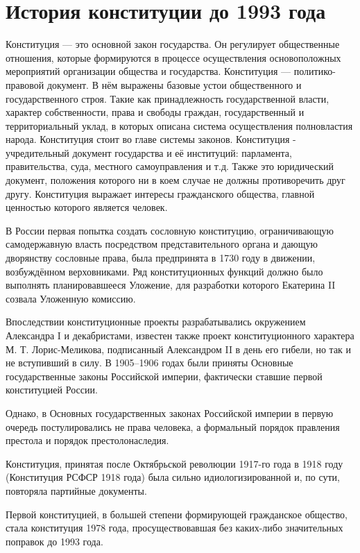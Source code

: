 \documentclass[a4paper,12pt]{diss_4}
\begin{document}

\addtocounter{page}{1}

\tableofcontents

\chapter{История конституции до 1993 года}

Конституция --- это основной закон государства. Он регулирует общественные отношения, которые формируются в процессе осуществления основоположных мероприятий организации общества и государства. Конституция --- политико-правовой документ. В нём выражены базовые устои общественного и государственного строя. Такие как принадлежность государственной власти, характер собственности, права и свободы граждан, государственный и территориальный уклад, в которых описана система осуществления полновластия народа. Конституция стоит во главе системы законов. Конституция - учредительный документ государства и её институций: парламента, правительства, суда, местного самоуправления и т.д. Также это юридический документ, положения которого ни в коем случае не должны противоречить друг другу. Конституция выражает интересы  гражданского общества, главной ценностью которого является человек.

В России первая попытка создать сословную конституцию, ограничивающую самодержавную власть посредством представительного органа и дающую дворянству сословные права, была предпринята в 1730 году в движении, возбуждённом верховниками. Ряд конституционных функций должно было выполнять планировавшееся Уложение, для разработки которого Екатерина II созвала Уложенную комиссию.

Впоследствии конституционные проекты разрабатывались окружением Александра I и декабристами, известен также проект конституционного характера М. Т. Лорис-Меликова, подписанный Александром II в день его гибели, но так и не вступивший в силу. В 1905--1906 годах были приняты Основные государственные законы Российской империи, фактически ставшие первой конституцией России.

Однако, в Основных государственных законах Российской империи в первую очередь постулировались не права человека, а формальный порядок правления престола и порядок престолонаследия. 

Конституция, принятая после Октябрьской революции 1917-го года в 1918 году (Конституция РСФСР 1918 года) была сильно идиологизированной и, по сути, повторяла партийные документы.

Первой конституцией, в большей степени формирующей гражданское общество, стала конституция 1978 года, просуществовавшая без каких-либо значительных поправок до 1993 года.
\end{document}
